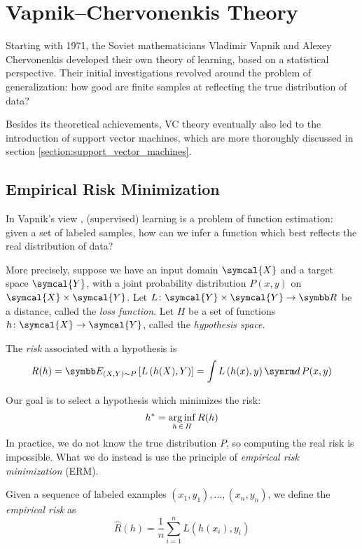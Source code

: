 \section{Vapnik–Chervonenkis Theory}

Starting with 1971, the Soviet mathematicians Vladimir Vapnik and Alexey Chervonenkis developed their own theory of learning, based on a statistical perspective. Their initial investigations revolved around the problem of generalization: how good are finite samples at reflecting the true distribution of data?

Besides its theoretical achievements, VC theory eventually also led to the introduction of support vector machines, which are more thoroughly discussed in section \ref{section:support_vector_machines}.

\subsection{Empirical Risk Minimization}
\label{section:empirical_risk_minimization}

In Vapnik's view \cite{Vapnik1991}, (supervised) learning is a problem of function estimation: given a set of labeled samples, how can we infer a function which best reflects the real distribution of data?

More precisely, suppose we have an input domain \(\symcal{X}\) and a target space \(\symcal{Y}\), with a joint probability distribution \(P(x, y)\) on \(\symcal{X} \times \symcal{Y}\). Let \(L \colon \symcal{Y} \times \symcal{Y} \to \reals\) be a distance, called the \emph{loss function}. Let \(H\) be a set of functions \(h \colon \symcal{X} \to \symcal{Y}\), called the \emph{hypothesis space}.

\begin{definition}
The \emph{risk} associated with a hypothesis is 
\[
    R(h) = \expectedvalue_{(X, Y) \sim P} \left[L\left(h(X), Y\right)\right] = \int L\left(h(x), y\right) \diff \, P(x, y)  
\]
\end{definition}

Our goal is to select a hypothesis which minimizes the risk:
\[
    h^* = \operatorname*{arg\,inf}_{h \, \in \, H} R(h)
\]
In practice, we do not know the true distribution \(P\), so computing the real risk is impossible. What we do instead is use the principle of \emph{empirical risk minimization} (ERM). 

\begin{definition}
Given a sequence of labeled examples \(\left(x_1, y_1\right), \dots, \left(x_n, y_n\right)\), we define the \emph{empirical risk} as
\[
    \widehat{R}(h) = \frac{1}{n} \sum_{i = 1}^{n} L\left(h(x_i), y_i\right)
\]
\end{definition}

